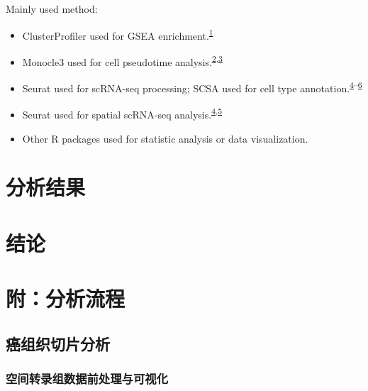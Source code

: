 \documentclass[
]{article}
\providecommand{\tightlist}{%
  \setlength{\itemsep}{0pt}\setlength{\parskip}{0pt}}
\begin{document}
Mainly used method:

\begin{itemize}
\tightlist
\item
  ClusterProfiler used for GSEA enrichment.\textsuperscript{\protect\hyperlink{ref-ClusterprofilerWuTi2021}{1}}
\item
  Monocle3 used for cell pseudotime analysis.\textsuperscript{\protect\hyperlink{ref-ReversedGraphQiuX2017}{2},\protect\hyperlink{ref-TheDynamicsAnTrapne2014}{3}}
\item
  Seurat used for scRNA-seq processing; SCSA used for cell type annotation.\textsuperscript{\protect\hyperlink{ref-IntegratedAnalHaoY2021}{4}--\protect\hyperlink{ref-ScsaACellTyCaoY2020}{6}}
\item
  Seurat used for spatial scRNA-seq analysis.\textsuperscript{\protect\hyperlink{ref-IntegratedAnalHaoY2021}{4},\protect\hyperlink{ref-ComprehensiveIStuart2019}{5}}
\item
  Other R packages used for statistic analysis or data visualization.
\end{itemize}

\hypertarget{results}{%
\section{分析结果}\label{results}}

\hypertarget{dis}{%
\section{结论}\label{dis}}

\hypertarget{workflow}{%
\section{附：分析流程}\label{workflow}}

\hypertarget{ux764cux7ec4ux7ec7ux5207ux7247ux5206ux6790}{%
\subsection{癌组织切片分析}\label{ux764cux7ec4ux7ec7ux5207ux7247ux5206ux6790}}

\hypertarget{ux7a7aux95f4ux8f6cux5f55ux7ec4ux6570ux636eux524dux5904ux7406ux4e0eux53efux89c6ux5316}{%
\subsubsection{空间转录组数据前处理与可视化}\label{ux7a7aux95f4ux8f6cux5f55ux7ec4ux6570ux636eux524dux5904ux7406ux4e0eux53efux89c6ux5316}}
\end{document}
